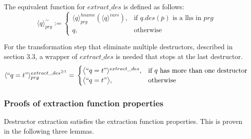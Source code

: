 The equivalent function for $extract\_des$ is defined as follows:
\[
    \langle q \rangle^{\sim}_{prg} :=
\begin{cases}
    \langle q \rangle^{hname}_{prg}(\langle q \rangle^{vars}),& \text{if $q.des(\overline{p})$ is a lhs in $prg$} \\
    q,                                                                                      & \text{otherwise}
\end{cases}
\]

For the transformation step that eliminate multiple destructors, described in section 3.3, a wrapper of $extract\_des$ is needed that stops at the last destructor.
\[
    \langle `` q = t " \rangle^{extract\_des^{\geq 1}}_{prg} =\\
\begin{cases}
    \big\langle `` q = t " \rangle^{extract\_des},& \text{if $q$ has more than one destructor} \\
   \big\langle `` q = t " \big\rangle,& \text{otherwise}
\end{cases}
\]

\subsubsection{Proofs of extraction function properties}

Destructor extraction satisfies the extraction function properties. This is proven in the following three lemmas.

